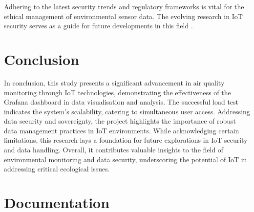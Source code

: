 \documentclass[12pt,oneside]{book} %
\begin{document}
Adhering to the latest security trends and regulatory frameworks is vital for
the ethical management of environmental sensor data. The evolving research in
IoT security serves as a guide for future developments in this field
\cite{CurrentResearchIoTSecurity2020}.

\newpage
\chapter{Conclusion}

In conclusion, this study presents a significant advancement in air quality
monitoring through IoT technologies, demonstrating the effectiveness of the
Grafana dashboard in data visualisation and analysis. The successful load test
indicates the system's scalability, catering to simultaneous user access.
Addressing data security and sovereignty, the project highlights the importance
of robust data management practices in IoT environments. While acknowledging
certain limitations, this research lays a foundation for future explorations in
IoT security and data handling. Overall, it contributes valuable insights to
the field of environmental monitoring and data security, underscoring the
potential of IoT in addressing critical ecological issues.




\appendix
\chapter{Documentation}
\end{document}
